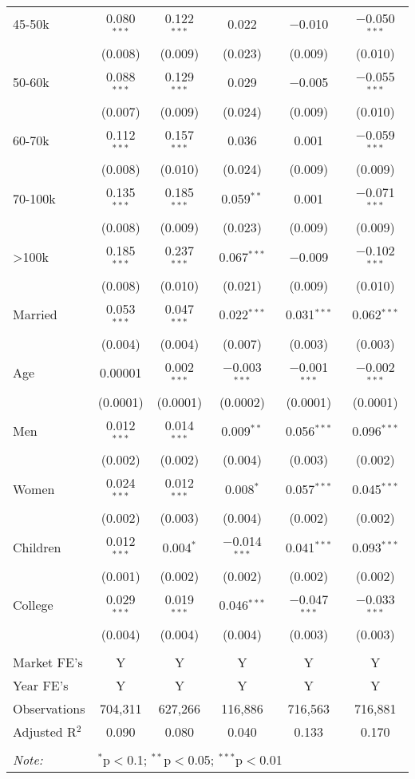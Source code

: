 \begin{table}[!htbp]
\begin{tabular}{@{\extracolsep{5pt}}lccccc}
  45-50k & 0.080$^{***}$ & 0.122$^{***}$ & 0.022 & $-$0.010 & $-$0.050$^{***}$ \\ 
  & (0.008) & (0.009) & (0.023) & (0.009) & (0.010) \\ 
  50-60k & 0.088$^{***}$ & 0.129$^{***}$ & 0.029 & $-$0.005 & $-$0.055$^{***}$ \\ 
  & (0.007) & (0.009) & (0.024) & (0.009) & (0.010) \\ 
  60-70k & 0.112$^{***}$ & 0.157$^{***}$ & 0.036 & 0.001 & $-$0.059$^{***}$ \\ 
  & (0.008) & (0.010) & (0.024) & (0.009) & (0.009) \\ 
  70-100k & 0.135$^{***}$ & 0.185$^{***}$ & 0.059$^{**}$ & 0.001 & $-$0.071$^{***}$ \\ 
  & (0.008) & (0.009) & (0.023) & (0.009) & (0.009) \\ 
  >100k & 0.185$^{***}$ & 0.237$^{***}$ & 0.067$^{***}$ & $-$0.009 & $-$0.102$^{***}$ \\ 
  & (0.008) & (0.010) & (0.021) & (0.009) & (0.010) \\ 
  Married & 0.053$^{***}$ & 0.047$^{***}$ & 0.022$^{***}$ & 0.031$^{***}$ & 0.062$^{***}$ \\ 
  & (0.004) & (0.004) & (0.007) & (0.003) & (0.003) \\ 
  Age & 0.00001 & 0.002$^{***}$ & $-$0.003$^{***}$ & $-$0.001$^{***}$ & $-$0.002$^{***}$ \\ 
  & (0.0001) & (0.0001) & (0.0002) & (0.0001) & (0.0001) \\ 
  Men & 0.012$^{***}$ & 0.014$^{***}$ & 0.009$^{**}$ & 0.056$^{***}$ & 0.096$^{***}$ \\ 
  & (0.002) & (0.002) & (0.004) & (0.003) & (0.002) \\ 
  Women & 0.024$^{***}$ & 0.012$^{***}$ & 0.008$^{*}$ & 0.057$^{***}$ & 0.045$^{***}$ \\ 
  & (0.002) & (0.003) & (0.004) & (0.002) & (0.002) \\ 
  Children & 0.012$^{***}$ & 0.004$^{*}$ & $-$0.014$^{***}$ & 0.041$^{***}$ & 0.093$^{***}$ \\ 
  & (0.001) & (0.002) & (0.002) & (0.002) & (0.002) \\ 
  College & 0.029$^{***}$ & 0.019$^{***}$ & 0.046$^{***}$ & $-$0.047$^{***}$ & $-$0.033$^{***}$ \\ 
  & (0.004) & (0.004) & (0.004) & (0.003) & (0.003) \\ 
 \hline \\[-1.8ex] 
Market FE's & Y & Y & Y & Y & Y \\ 
Year FE's & Y & Y & Y & Y & Y \\ 
Observations & 704,311 & 627,266 & 116,886 & 716,563 & 716,881 \\ 
Adjusted R$^{2}$ & 0.090 & 0.080 & 0.040 & 0.133 & 0.170 \\ 
\hline 
\hline \\[-1.8ex] 
\textit{Note:}  & \multicolumn{5}{l}{$^{*}$p$<$0.1; $^{**}$p$<$0.05; $^{***}$p$<$0.01} \\ 
\end{tabular} 
\end{table} 
